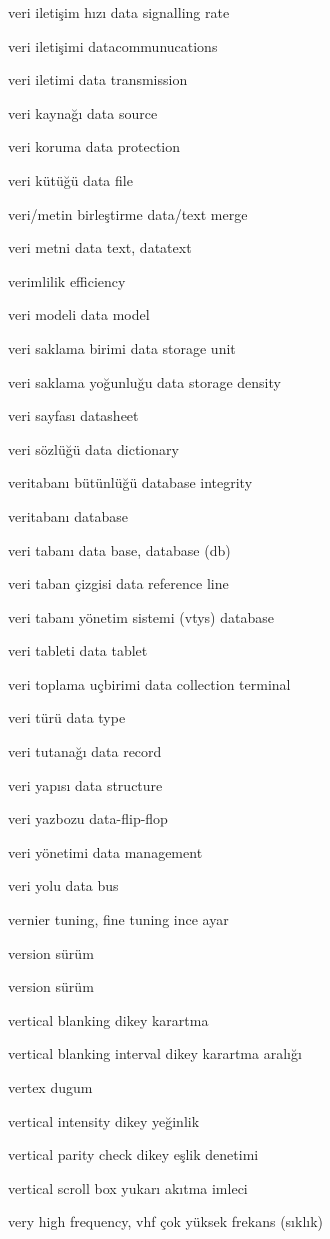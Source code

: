 \documentclass[12pt,fleqn]{article}\usepackage{../../common}
\begin{document}
veri iletişim hızı data signalling rate

veri iletişimi datacommunucations

veri iletimi data transmission

veri kaynağı data source

veri koruma data protection

veri kütüğü data file

veri/metin birleştirme data/text merge

veri metni data text, datatext

verimlilik efficiency

veri modeli data model

veri saklama birimi data storage unit

veri saklama yoğunluğu data storage density

veri sayfası datasheet

veri sözlüğü data dictionary

veritabanı bütünlüğü database integrity

veritabanı database

veri tabanı data base, database (db)

veri taban çizgisi data reference line

veri tabanı yönetim sistemi (vtys) database

veri tableti data tablet

veri toplama uçbirimi data collection terminal

veri türü data type

veri tutanağı data record

veri yapısı data structure

veri yazbozu data-flip-flop

veri yönetimi data management

veri yolu data bus

vernier tuning, fine tuning ince ayar

version sürüm

version sürüm

vertical blanking dikey karartma

vertical blanking interval dikey karartma aralığı

vertex dugum 

vertical intensity dikey yeğinlik

vertical parity check dikey eşlik denetimi

vertical scroll box yukarı akıtma imleci

very high frequency, vhf çok yüksek frekans (sıklık)
\end{document}

